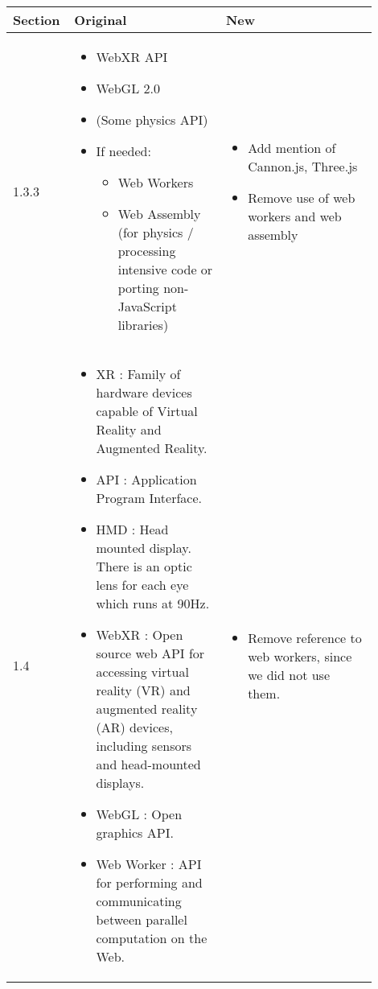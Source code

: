 \documentclass[onecolumn, draftclsnofoot,10pt, compsoc]{IEEEtran}
\begin{document}
\begin{longtable}{ |p{0.1\linewidth}|p{0.4\linewidth}|p{0.4\linewidth}| }

\hline
\textbf{Section} & \textbf{Original} & \textbf{New} \\
\hline
1.3.3
&
\begin{itemize}
    \item WebXR API
    \item WebGL 2.0
    \item (Some physics API)
    \item If needed:
    \begin{itemize}
        \item Web Workers
        \item Web Assembly (for physics / processing intensive code or porting non-JavaScript libraries)
    \end{itemize}
\end{itemize}
& 
\begin{itemize}
    \item Add mention of Cannon.js, Three.js
    \item Remove use of web workers and web assembly
\end{itemize} \\
\hline

1.4
&
\begin{itemize}
    \item XR : Family of hardware devices capable of Virtual Reality and Augmented Reality.
    \item API : Application Program Interface.
    \item HMD : Head mounted display. There is an optic lens for each eye which runs at 90Hz.
    \item WebXR : Open source web API for accessing virtual reality (VR) and augmented reality (AR) devices, including sensors and head-mounted displays.
    \item WebGL : Open graphics API.
    \item Web Worker : API for performing and communicating between parallel computation on the Web.
\end{itemize}
&
\begin{itemize}
    \item Remove reference to web workers, since we did not use them.
\end{itemize} \\
\hline


\end{longtable}
\end{document}
